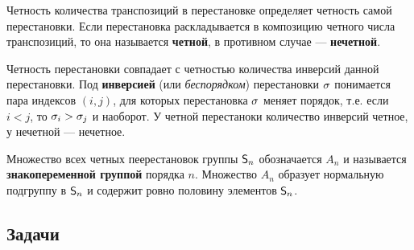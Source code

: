 Четность количества транспозиций в перестановке определяет четность самой перестановки. Если перестановка раскладывается в композицию четного числа транспозиций, то она называется \textbf{четной}, в противном случае --- \textbf{нечетной}.

Четность перестановки совпадает с четностью количества инверсий данной перестановки. Под \textbf{инверсией} (или \textit{беспорядком}) перестановки $\sigma$ понимается пара индексов $(i,j)$, для которых перестановка $\sigma$ меняет порядок, т.е. если $i<j$, то $\sigma_i>\sigma_j$ и наоборот. У четной перестаноки количество инверсий четное, у нечетной --- нечетное.

Множество всех четных пеерестановок группы ${\mathsf{S}}_n$ обозначается $A_n$ и называется \textbf{знакопеременной группой} порядка $n$. Множество $A_n$ образует нормальную подгруппу в ${\mathsf{S}}_n$ и содержит ровно половину элементов ${\mathsf{S}}_n$.

\subsection*{Задачи}


